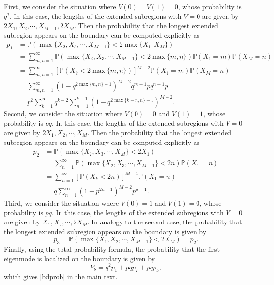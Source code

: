 \documentclass[a4paper,11pt]{article}
\begin{document}
\begin{appendices}
First, we consider the situation where $V(0) = V(1) = 0$, whose probability is $q^2$. In this case, the lengths of the extended subregions with $V = 0$ are given by $2 X_1, X_2, \cdots, X_{M-1}, 2 X_M$. Then the probability that the longest extended subregion appears on the boundary can be computed explicitly as
\begin{equation*}
\begin{split}
p_1 &= \mathbb{P}(\max\{X_2, X_3, \cdots, X_{M-1}\} < 2 \max\{X_1, X_M\}) \\
&= \sum_{m,n=1}^{\infty} \mathbb{P}(\max\{X_2, X_3, \cdots, X_{M-1}\} < 2 \max\{m,  n\}) \mathbb{P}(X_1 = m) \mathbb{P}(X_M = n) \\
&= \sum_{m,n=1}^{\infty} [\mathbb{P}(X_k < 2 \max\{m,n\}) ]^{M-2} \mathbb{P}(X_1 = m) \mathbb{P}(X_M = n)\\
&= \sum_{m,n=1}^{\infty} (1 - q^{2 \max\{m,n\}-1})^{M-2} q^{m-1} p q^{n-1} p\\
&= p^2\sum_{k=1}^{\infty} q^{k-2} \sum_{n=1}^{k-1} (1 - q^{2 \max\{k-n,n\}-1})^{M-2}.
\end{split}
\end{equation*}
Second, we consider the situation where $V(0) = 0$ and $V(1) = 1$, whose probability is $p q$. In this case, the lengths of the extended subregions with $V = 0$ are given by $2 X_1, X_2, \cdots, X_M$. Then the probability that the longest extended subregion appears on the boundary can be computed explicitly as
\begin{equation*}
\begin{split}
p_2 &= \mathbb{P}(\max\{X_2, X_3, \cdots, X_{M}\} < 2 X_1) \\
&= \sum_{n=1}^{\infty} \mathbb{P}(\max\{X_2, X_3, \cdots, X_{M-1}\} < 2 n) \mathbb{P}(X_1 = n) \\
&= \sum_{n=1}^{\infty} [\mathbb{P}(X_k < 2 n)]^{M-1} \mathbb{P}(X_1 = n)\\
&= q \sum_{n=1}^{\infty} (1 - p^{2 n-1})^{M-2} p^{n-1}.
\end{split}
\end{equation*}
Third, we consider the situation where $V(0) = 1$ and $V(1) = 0$, whose probability is $p q$. In this case, the lengths of the extended subregions with $V = 0$ are given by $X_1, X_2, \cdots, 2X_M$. In analogy to the second case, the probability that the longest extended subregion appears on the boundary is given by
\begin{equation*}
p_3 = \mathbb{P}(\max\{X_1, X_2, \cdots, X_{M-1}\} < 2 X_M) = p_2.
\end{equation*}
Finally, using the total probability formula, the probability that the first eigenmode is localized on the boundary is given by
\begin{equation*}
P_b = q^2p_1+pqp_2+pqp_3,
\end{equation*}
which gives \eqref{bdprob} in the main text.



\end{appendices}
\end{document}
